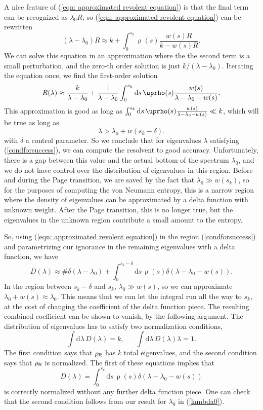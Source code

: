 \documentclass[11pt]{article}
\newcommand{\be}{\begin{equation}}
\newcommand{\ee}{\end{equation}}
\numberwithin{equation}{section}
\begin{document}
A nice feature of (\ref{eqn: approximated revolent equation}) is that the final term can be recognized as $\lambda_0 R$, so (\ref{eqn: approximated revolent equation}) can be rewritten
\be
(\lambda-\lambda_0)R \approx k+ \int_0^{s_k}\uprho(s) \frac{w(s)R}{k - w(s)R}.
\ee
We can solve this equation in an approximation where the the second term is a small perturbation, and the zero-th order solution is just $k / (\lambda-\lambda_0)$. Iterating the equation once, we find the first-order solution
\be
	R(\lambda)\approx {k\over \lambda-\lambda_0}+{1\over \lambda-\lambda_{0}}\int_0^{s_k} \mathrm{d}s\,\uprho(s){w(s)\over \lambda-\lambda_0-w(s)}.
\label{exp:resolvent1}
\ee 
This approximation is good as long as $\int_0^{s_k}\mathrm{d} s\,\uprho(s){w(s)\over \lambda-\lambda_0-w(s)}\ll k$, which will be true as long as 
\be
\lambda > \lambda_0 +  w(s_k-\delta).\label{condforsuccess}
\ee
with $\delta$ a control parameter. So we conclude that for eigenvalues $\lambda$ satisfying  (\ref{condforsuccess}), we can compute the resolvent to good accuracy. Unfortunately, there is a gap between this value and the actual bottom of the spectrum $\lambda_0$, and we do not have control over the distribution of eigenvalues in this region. Before and during the Page transition, we are saved by the fact that $\lambda_0 \gg w(s_k)$, so for the purposes of computing the von Neumann entropy, this is a narrow region where the density of eigenvalues can be approximated by a delta function with unknown weight. After the Page transition, this is no longer true, but the eigenvalues in the unknown region contribute a small amount to the entropy.

So, using (\ref{eqn: approximated revolent equation}) in the region (\ref{condforsuccess}) and parametrizing our ignorance in the remaining eigenvalues with a delta function, we have
\be
D(\lambda) \approx \# \delta(\lambda-\lambda_0) + \int_0^{s_k-\delta}\mathrm{d}s\,\uprho(s)\delta(\lambda-\lambda_0-w(s)).
\ee
In the region between $s_k-\delta$ and $s_k$, $\lambda_0 \gg w(s)$, so we can approximate $\lambda_0 + w(s) \approx \lambda_0$. This means that we can let the integral run all the way to $s_k$, at the cost of changing the coefficient of the delta function piece. The resulting combined coefficient can be shown to vanish, by the following argument. The distribution of eigenvalues has to satisfy two normalization conditions,
\be
\int \mathrm{d}\lambda\,D(\lambda) = k,\hspace{20pt}\int \mathrm{d}\lambda\,D(\lambda)\lambda = 1.
\ee
The first condition says that $\rho_{\sf{R}}$ has $k$ total eigenvalues, and the second condition says that $\rho_{\sf{R}}$ is normalized. The first of these equations implies that
\be
D(\lambda) = \int_0^{s_k}\mathrm{d}s\,\uprho(s)\delta(\lambda-\lambda_0 - w(s))\label{finalD}
\ee
is correctly normalized without any further delta function piece. One can check that the second condition follows from our result for $\lambda_0$ in (\ref{lambda0}).
\end{document}
